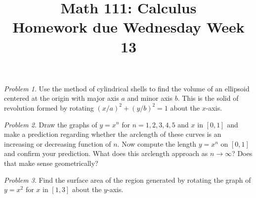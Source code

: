 \documentclass[11pt,twoside]{amsart}
\title{Math 111: Calculus\\ Homework due Wednesday Week 13}
\theoremstyle{plain}
\theoremstyle{remark}
\newtheorem{prob}{Problem}
\theoremstyle{definition}
\theoremstyle{definition}
\begin{document}
\maketitle

\begin{prob}
Use the method of cylindrical shells to find the volume of an ellipsoid centered at the origin with major axis $a$ and minor axis $b$. This is the solid of revolution formed by rotating $(x/a)^2+(y/b)^2=1$ about the $x$-axis.
\end{prob}

\begin{prob}
Draw the graphs of $y=x^n$ for $n=1,2,3,4,5$ and $x$ in $[0,1]$ and make a prediction regarding whether the arclength of these curves is an increasing or decreasing function of $n$. Now compute the length $y=x^n$ on $[0,1]$ and confirm your prediction. What does this arclength approach as $n\to \infty$? Does that make sense geometrically?
\end{prob}

\begin{prob}
Find the surface area of the region generated by rotating the graph of $y=x^2$ for $x$ in $[1,3]$ about the $y$-axis.
\end{prob}
\end{document}
